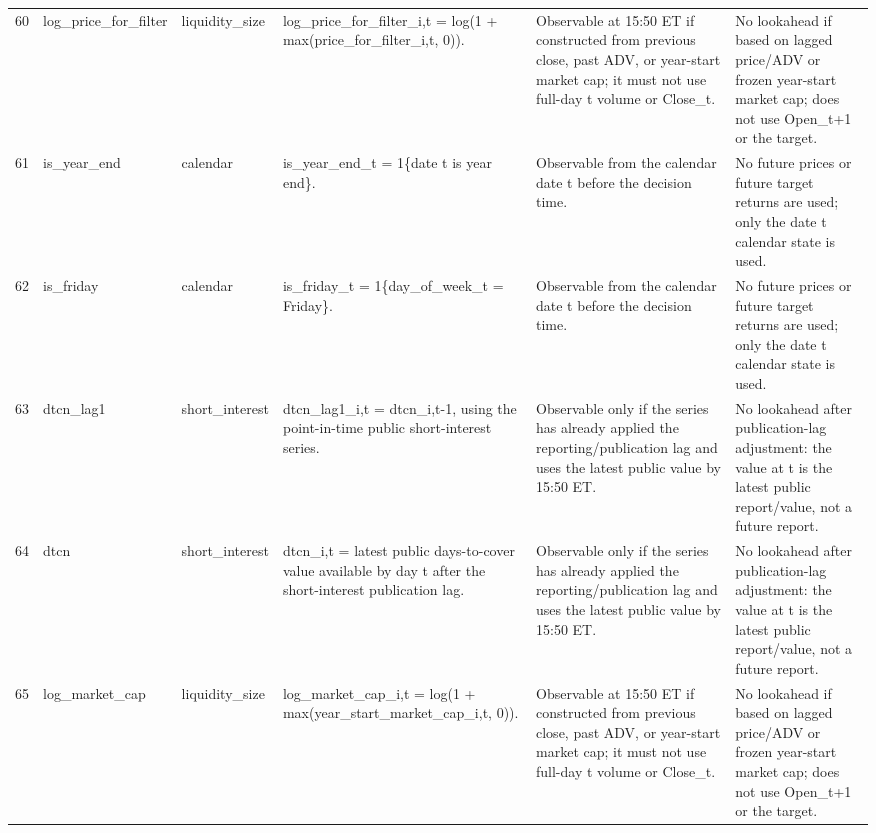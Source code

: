 \begin{landscape}
\begin{longtable}{P{0.42cm} P{2.25cm} P{2.05cm} P{5.25cm} P{4.85cm} P{5.25cm}}
60 & log\_\allowbreak{}price\_\allowbreak{}for\_\allowbreak{}filter & liquidity\_\allowbreak{}size & log\_\allowbreak{}price\_\allowbreak{}for\_\allowbreak{}filter\_\allowbreak{}i,t = log(1 + max(price\_\allowbreak{}for\_\allowbreak{}filter\_\allowbreak{}i,t, 0)). & Observable at 15:50 ET if constructed from previous close, past ADV, or year-start market cap; it must not use full-day t volume or Close\_\allowbreak{}t. & No lookahead if based on lagged price/ADV or frozen year-start market cap; does not use Open\_\allowbreak{}t+1 or the target. \\
61 & is\_\allowbreak{}year\_\allowbreak{}end & calendar & is\_\allowbreak{}year\_\allowbreak{}end\_\allowbreak{}t = 1\{date t is year end\}. & Observable from the calendar date t before the decision time. & No future prices or future target returns are used; only the date t calendar state is used. \\
62 & is\_\allowbreak{}friday & calendar & is\_\allowbreak{}friday\_\allowbreak{}t = 1\{day\_\allowbreak{}of\_\allowbreak{}week\_\allowbreak{}t = Friday\}. & Observable from the calendar date t before the decision time. & No future prices or future target returns are used; only the date t calendar state is used. \\
63 & dtcn\_\allowbreak{}lag1 & short\_\allowbreak{}interest & dtcn\_\allowbreak{}lag1\_\allowbreak{}i,t = dtcn\_\allowbreak{}i,t-1, using the point-in-time public short-interest series. & Observable only if the series has already applied the reporting/publication lag and uses the latest public value by 15:50 ET. & No lookahead after publication-lag adjustment: the value at t is the latest public report/value, not a future report. \\
64 & dtcn & short\_\allowbreak{}interest & dtcn\_\allowbreak{}i,t = latest public days-to-cover value available by day t after the short-interest publication lag. & Observable only if the series has already applied the reporting/publication lag and uses the latest public value by 15:50 ET. & No lookahead after publication-lag adjustment: the value at t is the latest public report/value, not a future report. \\
65 & log\_\allowbreak{}market\_\allowbreak{}cap & liquidity\_\allowbreak{}size & log\_\allowbreak{}market\_\allowbreak{}cap\_\allowbreak{}i,t = log(1 + max(year\_\allowbreak{}start\_\allowbreak{}market\_\allowbreak{}cap\_\allowbreak{}i,t, 0)). & Observable at 15:50 ET if constructed from previous close, past ADV, or year-start market cap; it must not use full-day t volume or Close\_\allowbreak{}t. & No lookahead if based on lagged price/ADV or frozen year-start market cap; does not use Open\_\allowbreak{}t+1 or the target. \\

\end{longtable}
\end{landscape}
